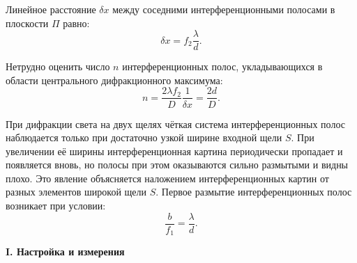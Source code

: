 \documentclass[a4paper,12pt]{article} %
\begin{document}
	Линейное расстояние $\delta x$ между соседними интерференционными полосами в плоскости $\Pi$ равно:
	\begin{equation*}
		\delta x = f_2 \frac{\lambda}{d}.
	\end{equation*}

	Нетрудно оценить число $n$ интерференционных полос, укладывающихся в области центрального дифракционного максимума:
	\begin{equation*}
		n = \frac{2\lambda f_2}{D} \frac{1}{\delta x} = \frac{2d}{D}.
	\end{equation*}
	
	
	При дифракции света на двух щелях чёткая система интерференционных полос наблюдается только при достаточно узкой ширине входной щели $S$. При увеличении её ширины интерференционная картина периодически пропадает и появляется вновь, но полосы при этом оказываются сильно размытыми и видны плохо. Это явление объясняется наложением интерференционных картин от разных элементов широкой щели $S$. Первое размытие интерференционных полос возникает при условии:
	\begin{equation*}
		\frac{b}{f_1} = \frac{\lambda}{d}.
	\end{equation*}



	\begin{center}
		\textbf{I. Настройка и измерения}
	\end{center}
	
\end{document}
